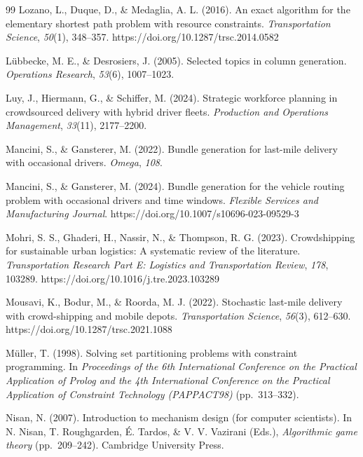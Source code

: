 \begin{singlespace}
\begin{thebibliography}{99}
Lozano, L., Duque, D., \& Medaglia, A. L. (2016). An exact algorithm for the
elementary shortest path problem with resource constraints.
\emph{Transportation Science}, \emph{50}(1), 348--357.
https://doi.org/10.1287/trsc.2014.0582 %

L{\"u}bbecke, M. E., \& Desrosiers, J. (2005). Selected topics in column
generation. \emph{Operations Research}, \emph{53}(6), 1007--1023.

Luy, J., Hiermann, G., \& Schiffer, M. (2024). Strategic workforce planning
in crowdsourced delivery with hybrid driver fleets. \emph{Production and
Operations Management}, \emph{33}(11), 2177--2200.

Mancini, S., \& Gansterer, M. (2022). Bundle generation for last-mile
delivery with occasional drivers. \emph{Omega}, \emph{108}.

Mancini, S., \& Gansterer, M. (2024). Bundle generation for the vehicle
routing problem with occasional drivers and time windows. \emph{Flexible
Services and Manufacturing Journal}.
https://doi.org/10.1007/s10696-023-09529-3 %

Mohri, S. S., Ghaderi, H., Nassir, N., \& Thompson, R. G. (2023).
Crowdshipping for sustainable urban logistics: A systematic review of the
literature. \emph{Transportation Research Part E: Logistics and
Transportation Review}, \emph{178}, 103289.
https://doi.org/10.1016/j.tre.2023.103289

Mousavi, K., Bodur, M., \& Roorda, M. J. (2022). Stochastic last-mile
delivery with crowd-shipping and mobile depots. \emph{Transportation
Science}, \emph{56}(3), 612--630. https://doi.org/10.1287/trsc.2021.1088

M{\"u}ller, T. (1998). Solving set partitioning problems with constraint
programming. In \emph{Proceedings of the 6th International Conference on
the Practical Application of Prolog and the 4th International Conference
on the Practical Application of Constraint Technology (PAPPACT98)}
(pp.~313--332). %

Nisan, N. (2007). Introduction to mechanism design (for computer
scientists). In N. Nisan, T. Roughgarden, {\'E}. Tardos, \& V. V. Vazirani
(Eds.), \emph{Algorithmic game theory} (pp.~209--242). Cambridge University
Press. %


\end{thebibliography}
\end{singlespace}

